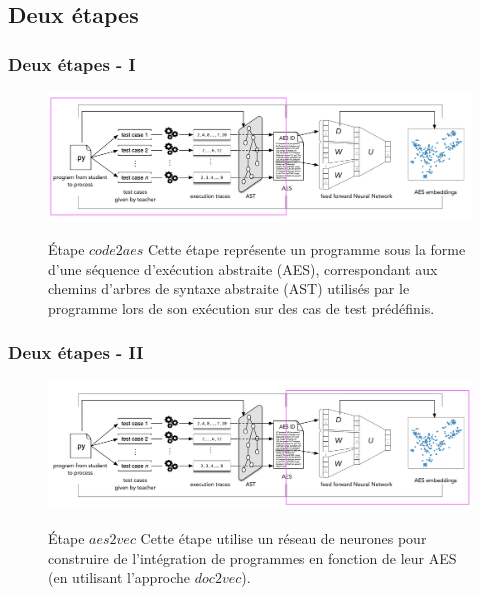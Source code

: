 \documentclass[xcolor=dvipsnames]{beamer}
\begin{document}
\subsection{Deux étapes}
\begin{frame}[fragile]
\frametitle{Deux étapes - I}
\begin{figure}[ht]
\begin{center}
\includegraphics[width=\textwidth]{./images/Figure_1.png}
\vspace{-0.5cm}

\begin{block}{Étape $code2aes$}
Cette étape représente un programme sous la forme d'une séquence d'exécution abstraite (AES), correspondant aux chemins d'arbres de syntaxe abstraite (AST) utilisés par le programme lors de son exécution sur des cas de test prédéfinis.
\end{block}
\end{center}
\end{figure}
\end{frame}

\begin{frame}[fragile]
\frametitle{Deux étapes - II}
\begin{figure}[ht]
\begin{center}
\includegraphics[width=\textwidth]{./images/Figure_2.png}
\vspace{-0.5cm}

\begin{block}{Étape $aes2vec$} 
Cette étape utilise un réseau de neurones pour construire de l’intégration de programmes en fonction de leur AES (en utilisant l'approche $doc2vec$).
\end{block}
\end{center}
\end{figure}
\end{frame}
\end{document}
